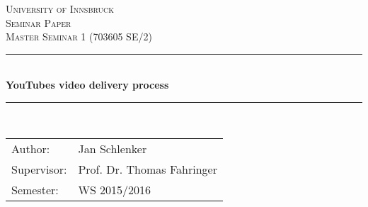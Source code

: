 \begin{titlepage}

\newcommand{\HRule}{\rule{\linewidth}{0.5mm}} %

\center %
 

\textsc{\LARGE University of Innsbruck}\\[1.5cm] %
\textsc{\Large Seminar Paper}\\[0.5cm] %
\textsc{\large Master Seminar 1 (703605 SE/2)}\\[0.5cm] %


\HRule \\[0.4cm]
{ \huge \bfseries YouTubes video delivery process}\\[0.4cm] %
\HRule \\[1.5cm]
 

\begin{center}
\begin{tabular}{l l}
Author: & Jan Schlenker \\
Supervisor: &  Prof. Dr. Thomas Fahringer \\
Semester: & WS 2015/2016
\end{tabular}
\end{center}




\end{titlepage}
